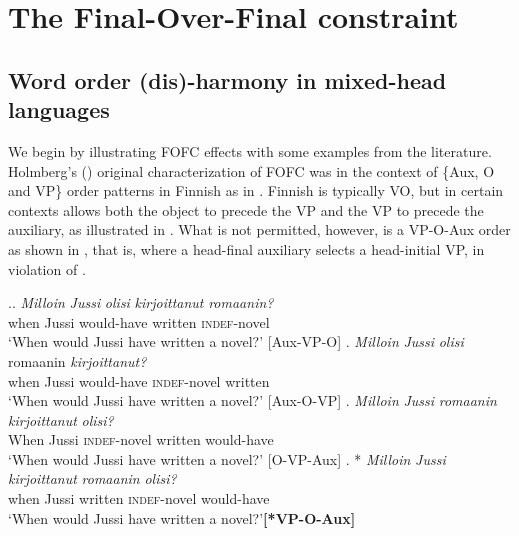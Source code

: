 \documentclass[output=paper]{langscibook}
\begin{document}
\section{The Final-Over-Final constraint}  \protect\label{fofc}
\subsection{Word order (dis)-harmony in mixed-head languages}  \protect\label{disharmony}

We begin by illustrating FOFC effects with some examples from the literature. Holmberg's (\citeyear{holmberg2000}) original characterization of FOFC was in the context of \{Aux, O and VP\} order patterns in Finnish as in \Next.   Finnish is typically VO, but in certain contexts allows both the object to precede the VP and the VP to precede the auxiliary, as illustrated in \Next[a-c].  What is not permitted, however, is a VP-O-Aux order as shown in \Next[d], that is, where a head-final auxiliary selects a head-initial VP, in violation of \Last.

\ex.\protect\label{finnish}\ag. 	\textit{Milloin} \textit{Jussi} \textit{olisi}	\textit{kirjoittanut} \textit{romaanin?} 		\\ 
		when Jussi would-have written	\textsc{indef}-novel \\
		`When would Jussi have written a novel?' \hfill{[Aux-VP-O]}
	\bg.	\textit{Milloin} \textit{Jussi} \textit{olisi}	romaanin	\textit{kirjoittanut?} 		 \\
		when Jussi would-have \textsc{indef}-novel written \\
		`When would Jussi have written a novel?'  \hfill{[Aux-O-VP]}
	\cg.	\textit{Milloin} \textit{Jussi} \textit{romaanin}	 \textit{kirjoittanut} \textit{olisi?}  \\
		When Jussi \textsc{indef}-novel written	would-have \\
		`When would Jussi have written a novel?' \hfill{[O-VP-Aux]}
	\dg.	* \textit{Milloin} \textit{Jussi} \textit{kirjoittanut} \textit{romaanin}  \textit{olisi?} 		 \\
	when	Jussi written	\textsc{indef}-novel would-have\\
		`When would Jussi have written a novel?'\hfill{\textbf{[*VP-O-Aux]}}\\
		\citep{holmberg2000}



\end{document}
